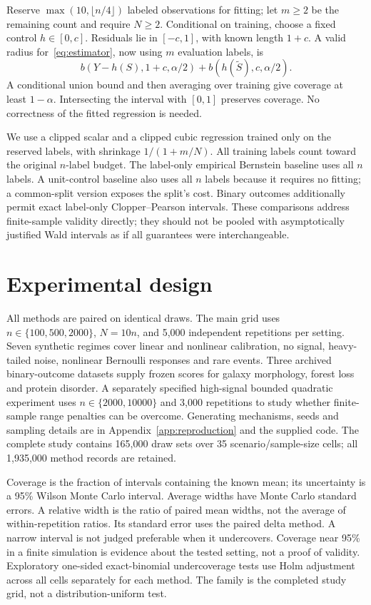Reserve $\max(10,\lfloor n/4\rfloor)$ labeled observations for fitting; let $m\ge2$ be the remaining count and require $N\ge2$. Conditional on training, choose a fixed control $h\in[0,c]$. Residuals lie in $[-c,1]$, with known length $1+c$. A valid radius for~\eqref{eq:estimator}, now using $m$ evaluation labels, is
\begin{equation}
 b(Y-h(S),1+c,\alpha/2)
 +b(h(\widetilde S),c,\alpha/2).
 \label{eq:finite}
\end{equation}
A conditional union bound and then averaging over training give coverage at least $1-\alpha$. Intersecting the interval with $[0,1]$ preserves coverage. No correctness of the fitted regression is needed.

We use a clipped scalar and a clipped cubic regression trained only on the reserved labels, with shrinkage $1/(1+m/N)$. All training labels count toward the original $n$-label budget. The label-only empirical Bernstein baseline uses all $n$ labels. A unit-control baseline also uses all $n$ labels because it requires no fitting; a common-split version exposes the split's cost. Binary outcomes additionally permit exact label-only Clopper--Pearson intervals. These comparisons address finite-sample validity directly; they should not be pooled with asymptotically justified Wald intervals as if all guarantees were interchangeable.

\section{Experimental design}\label{sec:design}
All methods are paired on identical draws. The main grid uses $n\in\{100,500,2000\}$, $N=10n$, and 5,000 independent repetitions per setting. Seven synthetic regimes cover linear and nonlinear calibration, no signal, heavy-tailed noise, nonlinear Bernoulli responses and rare events. Three archived binary-outcome datasets supply frozen scores for galaxy morphology, forest loss and protein disorder. A separately specified high-signal bounded quadratic experiment uses $n\in\{2000,10000\}$ and 3,000 repetitions to study whether finite-sample range penalties can be overcome. Generating mechanisms, seeds and sampling details are in Appendix~\ref{app:reproduction} and the supplied code. The complete study contains 165,000 draw sets over 35 scenario/sample-size cells; all 1,935,000 method records are retained.

Coverage is the fraction of intervals containing the known mean; its uncertainty is a 95\% Wilson Monte Carlo interval. Average widths have Monte Carlo standard errors. A relative width is the ratio of paired mean widths, not the average of within-repetition ratios. Its standard error uses the paired delta method. A narrow interval is not judged preferable when it undercovers. Coverage near 95\% in a finite simulation is evidence about the tested setting, not a proof of validity. Exploratory one-sided exact-binomial undercoverage tests use Holm adjustment across all cells separately for each method. The family is the completed study grid, not a distribution-uniform test.

